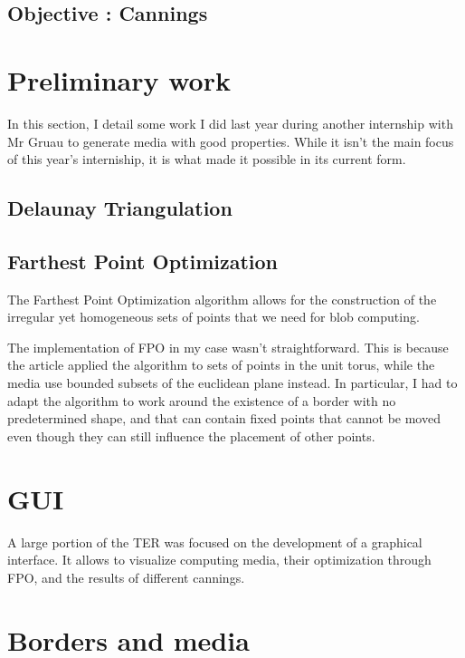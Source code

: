 \documentclass{article}
\begin{document}
\subsection{Objective : Cannings}

\section{Preliminary work}

In this section, I detail some work I did last year during another internship with Mr Gruau to generate media with good properties. While it isn't the main focus of this year's interniship, it is what made it possible in its current form.

\subsection{Delaunay Triangulation}

\subsection{Farthest Point Optimization}

The Farthest Point Optimization algorithm \supercite{FPO} allows for the construction of the irregular yet homogeneous sets of points that we need for blob computing.

The implementation of FPO in my case wasn't straightforward. This is because the article applied the algorithm to sets of points in the unit torus, while the media use bounded subsets of the euclidean plane instead. In particular, I had to adapt the algorithm to work around the existence of a border with no predetermined shape, and that can contain fixed points that cannot be moved even though they can still influence the placement of other points.

\renewcommand{\thesection}{\arabic{section}}
\setcounter{section}{0}

\section{GUI}

A large portion of the TER was focused on the development of a graphical interface. It allows to visualize computing media, their optimization through FPO, and the results of different cannings.

\section{Borders and media}
\end{document}
